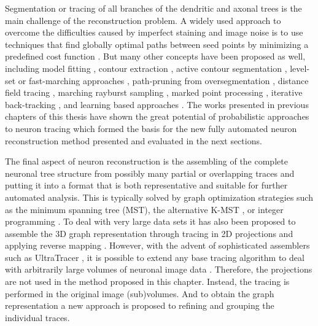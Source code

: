 Segmentation or tracing of all branches of the dendritic and axonal trees is the main challenge of the reconstruction problem. A widely used approach to overcome the difficulties caused by imperfect staining and image noise is to use techniques that find globally optimal paths between seed points by minimizing a predefined cost function \cite{meijering2004design, peng2011automatic, longair2011simple, quan2016neurogps}. But many other concepts have been proposed as well, including model fitting \cite{schmitt2004new,zhao2011automated}, contour extraction \cite{leandro2009automatic}, active contour segmentation \cite{wang2011broadly, luo2015neuron}, level-set or fast-marching approaches \cite{xiao2013app2, basu2014reconstructing}, path-pruning from oversegmentation \cite{peng2011automatic}, distance field tracing \cite{yang2013distance}, marching rayburst sampling \cite{ming2013rapid}, marked point processing \cite{basu2016neurite}, iterative back-tracking \cite{liu2016rivulet}, and learning based approaches \cite{chen2015smarttracing, gala2014active, santamaria2015automatic}. The works presented in previous chapters of this thesis \cite{radojevic2015automated, radojevic2017automated, radojevic2017neuron} have shown the great potential of probabilistic approaches to neuron tracing which formed the basis for the new fully automated neuron reconstruction method presented and evaluated in the next sections.

The final aspect of neuron reconstruction is the assembling of the complete neuronal tree structure from possibly many partial or overlapping traces and putting it into a format that is both representative and suitable for further automated analysis. This is typically solved by graph optimization strategies such as the minimum spanning tree (MST), the alternative K-MST \cite{turetken2011automated, gonzalez2010delineating}, or integer programming \cite{turetken2013reconstructing}. To deal with very large data sets it has also been proposed to assemble the 3D graph representation through tracing in 2D projections and applying reverse mapping \cite{zhou2016tremap}. However, with the advent of sophisticated assemblers such as UltraTracer \cite{peng2017automatic}, it is possible to extend any base tracing algorithm to deal with arbitrarily large volumes of neuronal image data \cite{peng2017automatic}. Therefore, the projections are not used in the method proposed in this chapter. Instead, the tracing is performed in the original image (sub)volumes. And to obtain the graph representation a new approach is proposed to refining and grouping the individual traces.

